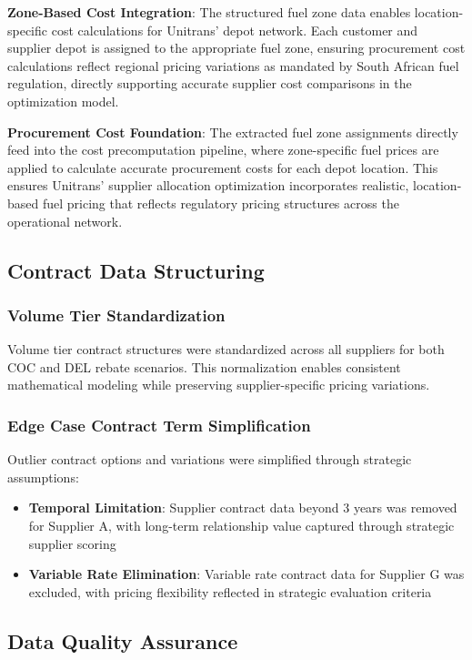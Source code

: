 \textbf{Zone-Based Cost Integration}: The structured fuel zone data enables location-specific cost calculations for Unitrans' depot network. Each customer and supplier depot is assigned to the appropriate fuel zone, ensuring procurement cost calculations reflect regional pricing variations as mandated by South African fuel regulation, directly supporting accurate supplier cost comparisons in the optimization model.

\textbf{Procurement Cost Foundation}: The extracted fuel zone assignments directly feed into the cost precomputation pipeline, where zone-specific fuel prices are applied to calculate accurate procurement costs for each depot location. This ensures Unitrans' supplier allocation optimization incorporates realistic, location-based fuel pricing that reflects regulatory pricing structures across the operational network.

\subsection{Contract Data Structuring}
\subsubsection{Volume Tier Standardization}
Volume tier contract structures were standardized across all suppliers for both COC and DEL rebate scenarios. This normalization enables consistent mathematical modeling while preserving supplier-specific pricing variations.

\subsubsection{Edge Case Contract Term Simplification}
Outlier contract options and variations were simplified through strategic assumptions:
\begin{itemize}
    \item \textbf{Temporal Limitation}: Supplier contract data beyond 3 years was removed for Supplier A, with long-term relationship value captured through strategic supplier scoring
    \item \textbf{Variable Rate Elimination}: Variable rate contract data for Supplier G was excluded, with pricing flexibility reflected in strategic evaluation criteria
\end{itemize}

\subsection{Data Quality Assurance}
